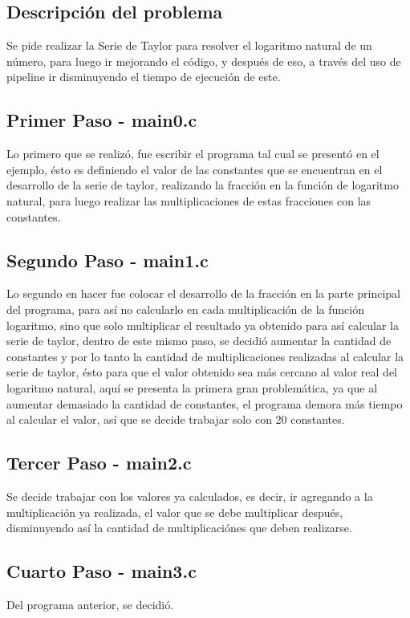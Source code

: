 \documentclass[12pt,letterpaper]{article}
\begin{document}
\subsection{Descripción del problema}
Se pide realizar la Serie de Taylor para resolver el logaritmo natural de un número, para luego ir mejorando el código, y después de eso, a través del uso de pipeline ir disminuyendo el tiempo de ejecución de este.

\subsection{Primer Paso - main0.c}
Lo primero que se realizó, fue escribir el programa tal cual se presentó en el ejemplo, ésto es definiendo el valor de las constantes que se encuentran en el desarrollo de la serie de taylor, realizando la fracción en la función de logaritmo natural, para luego realizar las multiplicaciones de estas fracciones con las constantes.

\subsection{Segundo Paso - main1.c}
Lo segundo en hacer fue colocar el desarrollo de la fracción en la parte principal del programa, para así no calcularlo en cada multiplicación de la función logaritmo, sino que solo multiplicar el resultado ya obtenido para así calcular la serie de taylor, dentro de este mismo paso, se decidió aumentar la cantidad de constantes y por lo tanto la cantidad de multiplicaciones realizadas al calcular la serie de taylor, ésto para que el valor obtenido sea más cercano al valor real del logaritmo natural, aquí se presenta la primera gran problemática, ya que al aumentar demasiado la cantidad de constantes, el programa demora más tiempo al calcular el valor, así que se decide trabajar solo con 20 constantes.

\subsection{Tercer Paso - main2.c}
Se decide trabajar con los valores ya calculados, es decir, ir agregando a la multiplicación ya realizada, el valor que se debe multiplicar después, disminuyendo así la cantidad de multiplicaciónes que deben realizarse.

\subsection{Cuarto Paso - main3.c}
Del programa anterior, se decidió.
\end{document}
